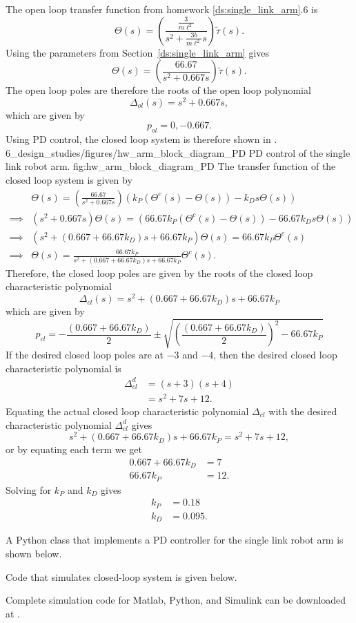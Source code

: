 
The open loop transfer function from homework \ref{ds:single_link_arm}.6 is
\[
\Theta(s) = \left(\frac{\frac{3}{m\ell^2}}{s^2+\frac{3b}{m\ell^2}s}\right)\tilde{\tau}(s).  
\]
Using the parameters from Section~\ref{ds:single_link_arm} gives
\[
\Theta(s) = \left(\frac{66.67}{s^2+0.667s}\right)\tilde{\tau}(s).  
\]
The open loop poles are therefore the roots of the open loop polynomial
\[
\Delta_{ol}(s) = s^2+0.667s,
\]
which are given by
\[
p_{ol} = 0, -0.667.
\]
Using PD control, the closed loop system is therefore shown in .
	{6_design_studies/figures/hw_arm_block_diagram_PD}
	{PD control of the single link robot arm.}
	{fig:hw_arm_block_diagram_PD}
The transfer function of the closed loop system is given by
\begin{align*}
& \Theta(s) = \left(\frac{66.67}{s^2+0.667s}\right)\left(k_P (\Theta^c(s)-\Theta(s)) - k_D s \Theta(s) \right)  \\
\implies & (s^2+0.667s)\Theta(s) = \left(66.67k_P (\Theta^c(s)-\Theta(s)) - 66.67k_D s \Theta(s) \right) \\
\implies & (s^2 + (0.667 + 66.67k_D)s + 66.67k_P)\Theta(s) = 66.67k_P \Theta^c(s)  \\
\implies & \Theta(s) = \frac{66.67k_P}{s^2 + (0.667 + 66.67k_D)s + 66.67k_P}\Theta^c(s). 
\end{align*}
Therefore, the closed loop poles are given by the roots of the closed loop characteristic polynomial
\[
\Delta_{cl}(s) = s^2 + (0.667 + 66.67k_D)s + 66.67k_P
\]
which are given by
\[
p_{cl} = -\frac{(0.667 + 66.67k_D)}{2} \pm \sqrt{ \left(\frac{(0.667 + 66.67k_D)}{2}\right)^2 - 66.67k_P}
\]
If the desired closed loop poles are at $-3$ and $-4$, then the desired closed loop characteristic polynomial is
\begin{align*}
\Delta_{cl}^d &= (s+3)(s+4) \\
 &= s^2 + 7s + 12.
\end{align*}
Equating the actual closed loop characteristic polynomial $\Delta_{cl}$ with the desired characteristic polynomial $\Delta_{cl}^d$ gives
\[
s^2 + (0.667 + 66.67k_D)s + 66.67k_P = s^2 + 7s + 12,
\]
or by equating each term we get 
\begin{align*}
0.667 + 66.67k_D &=7 \\
66.67k_P &= 12.
\end{align*}
Solving for $k_P$ and $k_D$ gives
\begin{align*}
k_P &= 0.18 \\
k_D &= 0.095.
\end{align*}

A Python class that implements a PD controller for the single link robot arm is shown below.


Code that simulates closed-loop system is given below.


Complete simulation code for Matlab, Python, and Simulink can be downloaded at .
